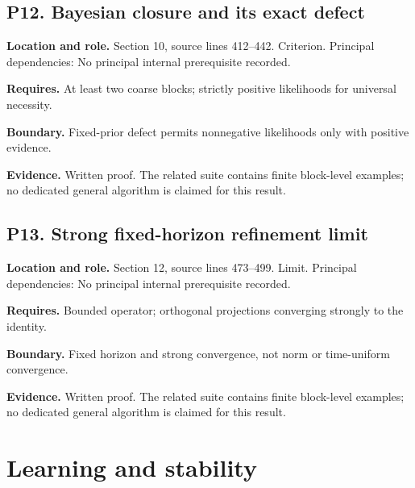 \documentclass[11pt,oneside,openany]{book}
\numberwithin{equation}{section}
\begin{document}
\par\noindent\begin{minipage}{\textwidth}
\subsection{P12. Bayesian closure and its exact
defect}\label{LSMRegister:p12.-bayesian-closure-and-its-exact-defect}

\textbf{Location and role.} Section 10, source lines 412--442.
Criterion. Principal dependencies: No principal internal prerequisite
recorded.

\textbf{Requires.} At least two coarse blocks; strictly positive
likelihoods for universal necessity.

\textbf{Boundary.} Fixed-prior defect permits nonnegative likelihoods
only with positive evidence.

\textbf{Evidence.} Written proof. The related suite contains finite
block-level examples; no dedicated general algorithm is claimed for this
result.
\end{minipage}\par\medskip

\par\noindent\begin{minipage}{\textwidth}
\subsection{P13. Strong fixed-horizon refinement
limit}\label{LSMRegister:p13.-strong-fixed-horizon-refinement-limit}

\textbf{Location and role.} Section 12, source lines 473--499. Limit.
Principal dependencies: No principal internal prerequisite recorded.

\textbf{Requires.} Bounded operator; orthogonal projections converging
strongly to the identity.

\textbf{Boundary.} Fixed horizon and strong convergence, not norm or
time-uniform convergence.

\textbf{Evidence.} Written proof. The related suite contains finite
block-level examples; no dedicated general algorithm is claimed for this
result.
\end{minipage}\par\medskip


\section{Learning and stability}\label{LSMRegister:learning-and-stability}
\end{document}
